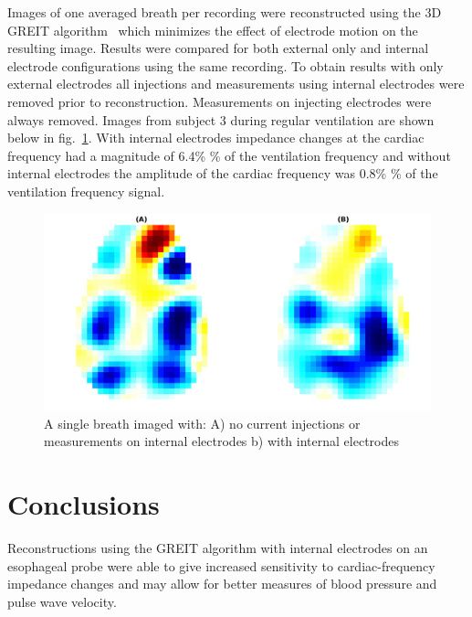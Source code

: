 Images of one averaged breath per recording
were reconstructed using the 3D GREIT 
algorithm~\cite{bartek2016} which minimizes the effect
of electrode motion on the resulting image.
Results were compared for both 
external only and internal electrode configurations
using the same recording.
To obtain results with only external electrodes  all 
injections and measurements using internal electrodes 
were removed prior to reconstruction. 
Measurements on injecting electrodes were always removed.
Images from subject 3 during regular ventilation are 
shown  below in fig.~\ref{fig:img_example}.
With internal electrodes impedance changes at the cardiac frequency had a magnitude of 6.4\% \%
of the ventilation frequency and without internal electrodes the amplitude of the cardiac frequency
was 0.8\% \% of the ventilation frequency signal.
\begin{figure}
\centering
\includegraphics[width=\columnwidth]{chapter6-internal_electrodes/imgs/lamb_imgs.pdf}
\caption[Reconstructed image of a single breath]{\label{fig:img_example}%
A single breath imaged with:
A) no current injections or measurements on internal
electrodes 
b) with internal electrodes
}
\label{fig:img_example}
\end{figure}
\section{Conclusions}
Reconstructions using the GREIT algorithm
with internal electrodes on 
an esophageal probe were able to give increased
sensitivity to cardiac-frequency impedance changes 
and may allow for better measures of blood pressure and pulse
wave velocity.   



